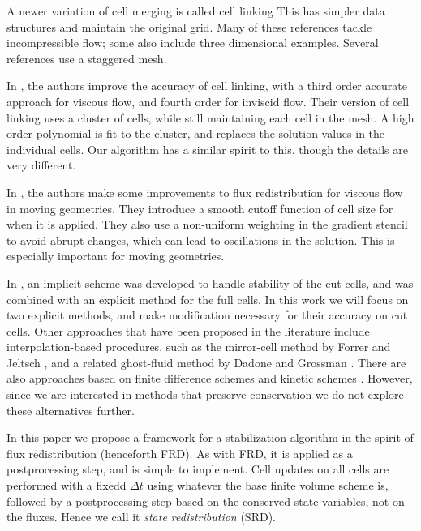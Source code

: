 A newer variation of cell merging is called cell linking \cite{cecereGiacomazzi,
KirkpatrickEtAl:2003, HuKhooAdamsHuang:2006,Chung et al} 
This has simpler data structures and maintain the original grid. 
Many of these references tackle incompressible flow; some also include
three dimensional examples. Several references use a staggered mesh. 

In \cite{BalajiMenon:2016}, the authors improve the accuracy of cell linking,
with a third order accurate approach for viscous flow,  and fourth order for 
inviscid flow. 
Their version of cell linking uses a cluster of cells,
while still maintaining each cell in the mesh.  A high order
polynomial is fit to the cluster, and replaces the solution values in the
individual cells.  Our algorithm has a similar spirit to this, though the
details are very different. 

In \cite{shws:2011}, the authors make
some improvements to flux redistribution for viscous flow in moving
geometries. They introduce a
smooth cutoff function of cell size for when it is applied. They also
use a non-uniform weighting in the gradient stencil to avoid abrupt
changes, which can lead to oscillations in the solution. This is
especially important for moving geometries.

In \cite{May-Berger:JSC}, an implicit scheme was developed to
handle stability of the cut cells, and was combined with an 
explicit method for the full cells. In this work we will focus on 
two explicit methods, and make modification necessary for their accuracy 
on cut cells.
Other approaches that have been proposed in the literature include
interpolation-based procedures, such as the mirror-cell method by Forrer
and Jeltsch \cite{article:FoJe98}, and a related ghost-fluid method by
Dadone and Grossman \cite{DadoneGrossman}.
There are also approaches based on finite difference schemes
\cite{SjogreenPetersson,MarcoBjorn}
and kinetic schemes \cite{Oksuzoglu:thesis,KeenKarni}.
However, since we are interested in methods
that preserve conservation we do not explore these alternatives further.

In this paper we propose a framework for a stabilization algorithm in
the spirit of flux redistribution (henceforth FRD). 
As with FRD, it is applied as a postprocessing
step, and is simple to implement. Cell updates on all cells are performed
with a fixedd $\Delta t$ using whatever the base finite volume scheme is, followed by a 
postprocessing step based on the
conserved state variables, not on the fluxes.
Hence we call it {\em state redistribution} (SRD).


